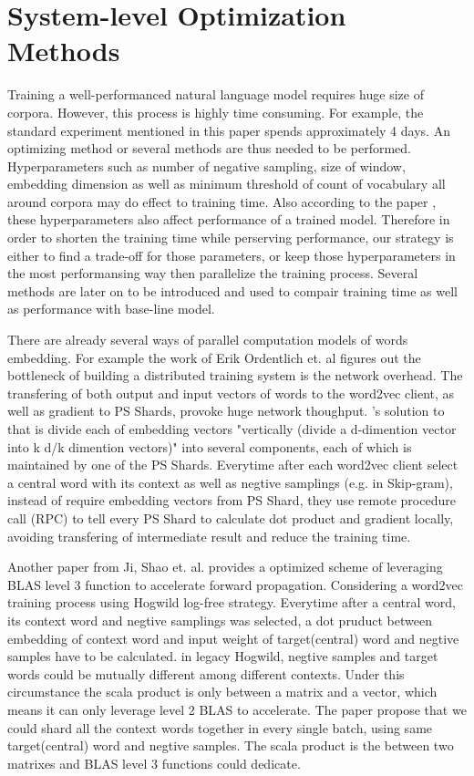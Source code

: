 \documentclass[11pt,a4paper]{article}
\begin{document}
\section{System-level Optimization Methods}
Training a well-performanced natural language model requires huge size of corpora. However, this process is highly time consuming. For example, the standard experiment mentioned in this paper spends approximately 4 days. An optimizing method or several methods are thus needed to be performed. Hyperparameters such as number of negative sampling, size of window, embedding dimension as well as minimum threshold of count of vocabulary all around corpora may do effect to training time. Also according to the paper \cite{levy2015improving}, these hyperparameters also affect performance of a trained model. Therefore in order to shorten the training time while perserving performance, our strategy is either to find a trade-off for those parameters, or keep those hyperparameters in the most performansing way then parallelize the training process. Several methods are later on to be introduced and used to compair training time as well as performance with base-line model.

There are already several ways of parallel computation models of words embedding. For example the work of Erik Ordentlich et. al \cite{ordentlich2016network} figures out the bottleneck of building a distributed training system is the network overhead. The transfering of both output and input vectors of words to the word2vec client, as well as gradient to PS Shards, provoke huge network thoughput. \citep{ordentlich2016network}'s solution to that is divide each of embedding vectors "vertically (divide a d-dimention vector into k d/k dimention vectors)" into several components, each of which is maintained by one of the PS Shards. Everytime after each word2vec client select a central word with its context as well as negtive samplings (e.g. in Skip-gram), instead of require embedding vectors from PS Shard, they use remote procedure call (RPC) to tell every PS Shard to calculate dot product and gradient locally, avoiding transfering of intermediate result and reduce the training time.

Another paper from Ji, Shao et. al. \cite{ji2016parallelizing} provides a optimized scheme of leveraging BLAS level 3 function to accelerate forward propagation. Considering a word2vec training process using Hogwild \cite{recht2011hogwild} log-free strategy. Everytime after a central word, its context word and negtive samplings was selected, a dot pruduct between embedding of context word and input weight of target(central) word and negtive samples have to be calculated. in legacy Hogwild, negtive samples and target words could be mutually different among different contexts. Under this circumstance the scala product is only between a matrix and a vector, which means it can only leverage level 2 BLAS to accelerate. The paper propose that we could shard all the context words together in every single batch, using same target(central) word and negtive samples. The scala product is the between two matrixes and BLAS level 3 functions could dedicate.
\end{document}
